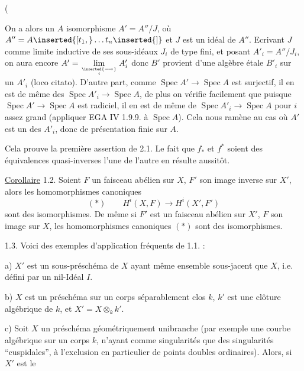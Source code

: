 (

On a alors un $A$ isomorphisme $A'=A''/J$, où $A''=A\inserted{[t_1,}\ldots t_n\inserted{]}$ et $J$ est un idéal de $A''$. Ecrivant $J$ comme limite inductive de ses sous-idéaux $J_i$ de type fini, et posant $A'_i=A''/J_i$, on aura encore $A'=\mathop{\lim}\limits_{\inserted{\longrightarrow}\atop i}A'_i$ donc $B'$ provient d'une algèbre étale $B'_i$ sur un $A'_i$ (loco citato). D'autre part, comme $\operatorname{Spec}A'\to\operatorname{Spec}A$ est surjectif, il en est de même des $\operatorname{Spec}A'_i\to\operatorname{Spec}A$, de plus on vérifie facilement que puisque $\operatorname{Spec}A'\to\operatorname{Spec}A$ est radiciel, il en est de même de $\operatorname{Spec}A'_i\to\operatorname{Spec}A$ pour $i$ assez grand (appliquer EGA IV 1.9.9. à $\operatorname{Spec}A$). Cela nous ramène au cas où $A'$ est un des $A'_i$, donc de présentation finie sur $A$.

Cela prouve la première assertion de 2.1. Le fait que $f_*$ et $f^*$ soient des équivalences quasi-inverses l'une de l'autre en résulte aussitôt.

\uline{Corollaire} 1.2. Soient $F$ un faisceau abélien sur $X$, $F'$ son image inverse sur $X'$, alors les homomorphismes canoniques
\[
(*)\qquad H^i(X,F)\longrightarrow H^i(X',F')
\]
sont des isomorphismes. De même si $F'$ est un faisceau abélien sur $X'$, $F$ son image sur $X$, les homomorphismes canoniques $(*)$ sont des isomorphismes.

1.3. Voici des exemples d'application fréquents de 1.1. :


a) $X'$ est un sous-préschéma de $X$ ayant même ensemble sous-jacent que $X$, i.e. défini par un nil-Idéal $I$.

b) $X$ est un préschéma sur un corps séparablement clos $k$, $k'$ est une clôture algébrique de $k$, et $X'=X\otimes_k k'$.

 c) Soit $X$ un préschéma géométriquement unibranche (par exemple une courbe algébrique sur un corps $k$, n'ayant comme singularités que des singularités ``cuspidales'', à l'exclusion en particulier de points doubles ordinaires). Alors, si $X'$ est le 
